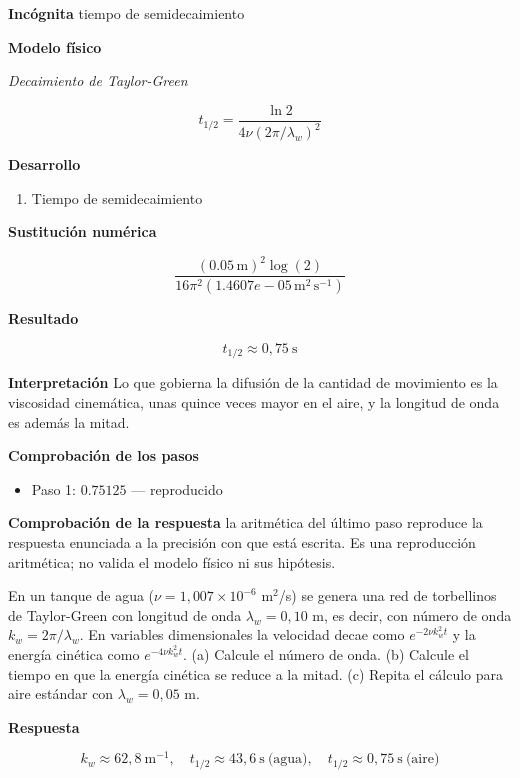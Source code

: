 \documentclass[10pt,openany]{book}
\begin{document}
\noindent\textbf{Incógnita}
tiempo de semidecaimiento

\noindent\textbf{Modelo físico}

\noindent\textit{Decaimiento de Taylor-Green}

\[
t_{1/2} = \frac{\ln 2}{4\nu(2\pi/\lambda_w)^{2}}
\]

\noindent\textbf{Desarrollo}
\begin{enumerate}
\item
Tiempo de semidecaimiento
\end{enumerate}

\noindent\textbf{Sustitución numérica}

\[
\frac{\left(0.05\,\mathrm{m}\right)^{2} \log{\left(2 \right)}}{16 \pi^{2} \left(1.4607e-05\,\mathrm{m}^{2}\,\mathrm{s}^{-1}\right)}
\]

\noindent\textbf{Resultado}

\[
t_{1/2} \approx 0{,}75\ \mathrm{s}
\]

\noindent\textbf{Interpretación}
Lo que gobierna la difusión de la cantidad de movimiento es la viscosidad cinemática, unas quince veces mayor en el aire, y la longitud de onda es además la mitad.

\noindent\textbf{Comprobación de los pasos}
\begin{itemize}
\item Paso 1: $0.75125$ — reproducido
\end{itemize}

\noindent\textbf{Comprobación de la respuesta} la aritmética del último paso reproduce la respuesta enunciada a la precisión con que está escrita. Es una reproducción aritmética; no valida el modelo físico ni sus hipótesis.

En un tanque de agua (\(\nu = 1{,}007\times 10^{-6}\) m\(^2\)/s) se genera una red de torbellinos de Taylor-Green con longitud de onda \(\lambda_w = 0{,}10\) m, es decir, con número de onda \(k_w = 2\pi/\lambda_w\). En variables dimensionales la velocidad decae como \(e^{-2\nu k_w^{2} t}\) y la energía cinética como \(e^{-4\nu k_w^{2} t}\). (a) Calcule el número de onda. (b) Calcule el tiempo en que la energía cinética se reduce a la mitad. (c) Repita el cálculo para aire estándar con \(\lambda_w = 0{,}05\) m.

\noindent\textbf{Respuesta}

\[
k_w \approx 62{,}8\ \mathrm{m^{-1}},\quad t_{1/2} \approx 43{,}6\ \mathrm{s}\ \text{(agua)},\quad t_{1/2} \approx 0{,}75\ \mathrm{s}\ \text{(aire)}
\]
\end{document}
